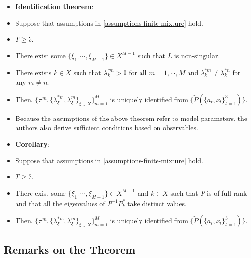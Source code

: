 \documentclass[]{book}
\providecommand{\tightlist}{%
  \setlength{\itemsep}{0pt}\setlength{\parskip}{0pt}}
\begin{document}
\begin{itemize}
\tightlist
\item
  \textbf{Identification theorem}:
\item
  Suppose that assumptions in \ref{assumptions-finite-mixture} hold.
\item
  \(T \ge 3\).
\item
  There exist some \(\{\xi_1, \cdots, \xi_{M - 1}\} \in X^{M - 1}\) such
  that \(L\) is non-singular.
\item
  There exists \(k \in X\) such that \(\lambda_k^{*m} > 0\) for all
  \(m = 1, \cdots, M\) and \(\lambda_k^{*m} \neq \lambda_k^{*n}\) for
  any \(m \neq n\).
\item
  Then,
  \(\{\pi^m, \{\lambda_\xi^{*m}, \lambda_\xi^m\}_{\xi \in X}\}_{m = 1}^M\)
  is uniquely identified from
  \(\{\widetilde{P}(\{a_t, x_t\}_{t = 1}^3)\}\).
\item
  Because the assumptions of the above theorem refer to model
  parameters, the authors also derive sufficient conditions based on
  observables.
\item
  \textbf{Corollary}:
\item
  Suppose that assumptions in \ref{assumptions-finite-mixture} hold.
\item
  \(T \ge 3\).
\item
  There exist some \(\{\xi_1, \cdots, \xi_{M - 1}\} \in X^{M - 1}\) and
  \(k \in X\) such that \(P\) is of full rank and that all the
  eigenvalues of \(P^{-1}P_k^*\) take distinct values.
\item
  Then,
  \(\{\pi^m, \{\lambda_\xi^{*m}, \lambda_\xi^m\}_{\xi \in X}\}_{m = 1}^M\)
  is uniquely identified from
  \(\{\widetilde{P}(\{a_t, x_t\}_{t = 1}^3)\}\).
\end{itemize}

\subsection{Remarks on the Theorem}\label{remarks-on-the-theorem}
\end{document}
